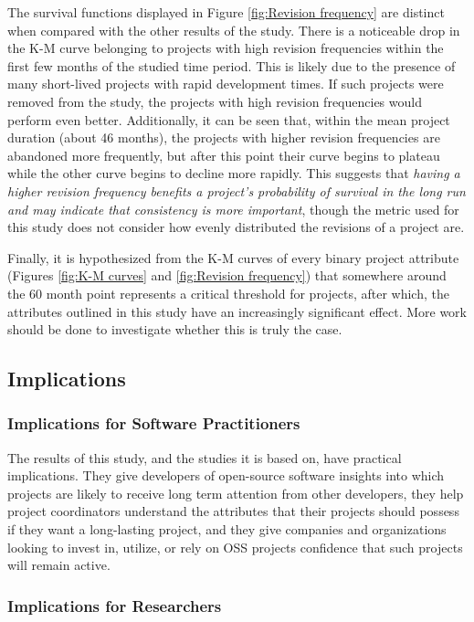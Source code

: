 \documentclass[sigconf]{acmart}
\begin{document}
The survival functions displayed in Figure \ref{fig:Revision frequency} are distinct when compared with the other results of the study.
There is a noticeable drop in the K-M curve belonging to projects with high revision frequencies within the first few months of the studied time period.
This is likely due to the presence of many short-lived projects with rapid development times.
If such projects were removed from the study, the projects with high revision frequencies would perform even better.
Additionally, it can be seen that, within the mean project duration (about 46 months), the projects with higher revision frequencies are abandoned more frequently, but after this point their curve begins to plateau while the other curve begins to decline more rapidly.
This suggests that \emph{having a higher revision frequency benefits a project's probability of survival in the long run and may indicate that consistency is more important}, though the metric used for this study does not consider how evenly distributed the revisions of a project are.

Finally, it is hypothesized from the K-M curves of every binary project attribute (Figures \ref{fig:K-M curves} and \ref{fig:Revision frequency}) that somewhere around the 60 month point represents a critical threshold for projects, after which, the attributes outlined in this study have an increasingly significant effect.
More work should be done to investigate whether this is truly the case.

\subsection{Implications} \label{implications}

\subsubsection{Implications for Software Practitioners} 

The results of this study, and the studies it is based on, have practical implications.
They give developers of open-source software insights into which projects are likely to receive long term attention from other developers, they help project coordinators understand the attributes that their projects should possess if they want a long-lasting project, and they give companies and organizations looking to invest in, utilize, or rely on OSS projects confidence that such projects will remain active.

\subsubsection{Implications for Researchers} 
\end{document}
